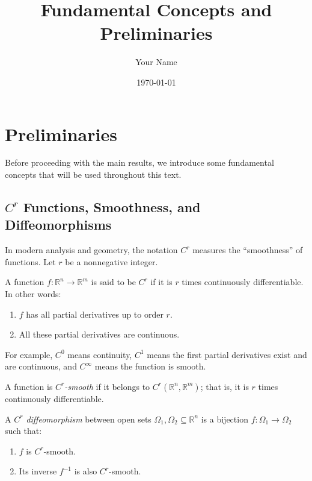 \documentclass[12pt,a4paper]{article}
\begin{document}
\title{Fundamental Concepts and Preliminaries}
\author{Your Name}
\date{\today}
\maketitle

\tableofcontents
\newpage

\section{Preliminaries}\label{sec:preliminaries}

Before proceeding with the main results, we introduce some fundamental concepts that will be used throughout this text.

\subsection{\texorpdfstring{$C^r$}{C\^{}r} Functions, Smoothness, and Diffeomorphisms}

In modern analysis and geometry, the notation \( C^r \) measures the ``smoothness'' of functions. Let \( r \) be a nonnegative integer.

\begin{definition}[\( C^r \) Functions]\label{def:Cr_functions}
A function \( f: \mathbb{R}^n \to \mathbb{R}^m \) is said to be \emph{\( C^r \)} if it is \( r \) times continuously differentiable. In other words:
\begin{enumerate}
    \item \( f \) has all partial derivatives up to order \( r \).
    \item All these partial derivatives are continuous.
\end{enumerate}
For example, \( C^0 \) means continuity, \( C^1 \) means the first partial derivatives exist and are continuous, and \( C^\infty \) means the function is smooth.
\end{definition}

\begin{definition}[\( C^r \)-Smoothness]\label{def:Cr_smoothness}
A function is \emph{\( C^r \)-smooth} if it belongs to \( C^r(\mathbb{R}^n, \mathbb{R}^m) \); that is, it is \( r \) times continuously differentiable.
\end{definition}

\begin{definition}[\( C^r \) Diffeomorphism]\label{def:Cr_diffeomorphism}
A \emph{\( C^r \) diffeomorphism} between open sets \( \Omega_1, \Omega_2 \subseteq \mathbb{R}^n \) is a bijection \( f: \Omega_1 \to \Omega_2 \) such that:
\begin{enumerate}
    \item \( f \) is \( C^r \)-smooth.
    \item Its inverse \( f^{-1} \) is also \( C^r \)-smooth.
\end{enumerate}
\end{definition}
\end{document}
